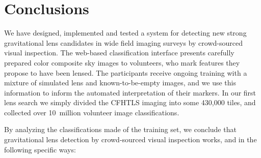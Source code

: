 \documentclass[useAMS,usenatbib,a4paper]{mn2e}
\begin{document}

\section{Conclusions}
\label{sec:conclude}

We have designed, implemented and tested a system for   detecting new strong
gravitational lens candidates in wide field imaging surveys by crowd-sourced
visual inspection. The \SW web-based classification interface presents carefully
prepared color composite sky images to volunteers, who mark features they
propose to  have been lensed. The participants receive ongoing training with a
mixture of simulated lens and known-to-be-empty images, and we use this
information to inform the automated interpretation of their markers. In our
first lens search we simply divided the CFHTLS imaging into some 430,000 tiles,
and collected over 10~million volunteer image classifications.


By analyzing the  classifications made of the training set, we conclude that
gravitational lens detection by crowd-sourced visual inspection works,  and in
the following specific ways:
\end{document}

